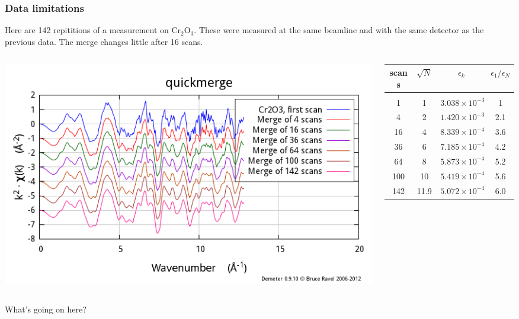 \documentclass[10pt, xcolor=x11names, compress]{beamer}
\begin{document}
\begin{frame}
  \frametitle{Data limitations}
  Here are 142 repititions of a measurement on Cr$_2$O$_3$.  These
  were measured at the same beamline and with the same detector as the
  previous data.  The merge changes little after 16 scans.

  \bigskip

  \begin{columns}[T]
    \begin{column}{0.5\linewidth}
      \includegraphics[width=\linewidth]{images/cr2o3.png}
    \end{column}
    \begin{column}{0.5\linewidth}
      \small
      \begin{tabular}[h]{cccc}
        scans & $\sqrt{N}$ & $\epsilon_k$ & $\epsilon_1/\epsilon_N$ \\
        \hline\\
        1   & 1  & $3.038\times 10^{-3}$ & 1 \\
        4   & 2  & $1.420\times 10^{-3}$ & 2.1 \\
        16  & 4  & $8.339\times 10^{-4}$ & 3.6 \\
        36  & 6  & $7.185\times 10^{-4}$ & 4.2 \\
        64  & 8  & $5.873\times 10^{-4}$ & 5.2 \\
        100 & 10 & $5.419\times 10^{-4}$ & 5.6 \\
        142 & 11.9 & $5.072\times 10^{-4}$ & 6.0
      \end{tabular}
    \end{column}
  \end{columns}

  \bigskip

  \begin{alertblock}{}
    \centering What's going on here?
  \end{alertblock}
\end{frame}
\end{document}
